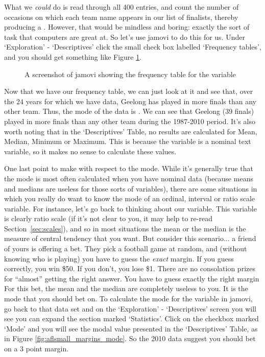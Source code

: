 What we {\it could} do is read through all 400 entries, and count the number of occasions on which each team name appears in our list of finalists, thereby producing a . However, that would be mindless and boring: exactly the sort of task that computers are great at. So let's use jamovi to do this for us. Under `Exploration' - `Descriptives' click the small check box labelled `Frequency tables', and you should get something like Figure \ref{fig:aflsmall_finalists_mode}. 

\vspace{1cm}
\begin{figure}[h]
\begin{center}
\caption{A screenshot of jamovi showing the frequency table for the  variable }
\label{fig:aflsmall_finalists_mode}
\HR
\end{center}
\end{figure}

Now that we have our frequency table, we can just look at it and see that, over the 24 years for which we have data, Geelong has played in more finals than any other team. Thus, the mode of the  data is . We can see that Geelong (39 finals) played in more finals than any other team during the 1987-2010 period. It's also worth noting that in the `Descriptives' Table, no results are calculated for Mean, Median, Minimum or Maximum. This is because the  variable is a nominal text variable, so it makes no sense to calculate these values.

One last point to make with respect to the mode. While it's generally true that the mode is most often calculated when you have nominal data (because means and medians are useless for those sorts of variables), there are some situations in which you really do want to know the mode of an ordinal, interval or ratio scale variable. For instance, let's go back to thinking about our  variable. This variable is clearly ratio scale (if it's not clear to you, it may help to re-read Section~\ref{sec:scales}), and so in most situations the mean or the median is the measure of central tendency that you want. But consider this scenario... a friend of yours is offering a bet. They pick a football game at random, and (without knowing who is playing) you have to guess the {\it exact} margin. If you guess correctly, you win \$50. If you don't, you lose \$1. There are no consolation prizes for ``almost'' getting the right answer. You have to guess exactly the right margin For this bet, the mean and the median are completely useless to you. It is the mode that you should bet on. To calculate the mode for the  variable in jamovi, go back to that data set and on the `Exploration' - `Descriptives' screen you will see you can expand the section marked `Statistics'. Click on the checkbox marked `Mode' and you will see the modal value presented in the `Descriptives' Table, as in Figure \ref{fig:aflsmall_margins_mode}. So the 2010 data suggest you should bet on a 3 point margin.

